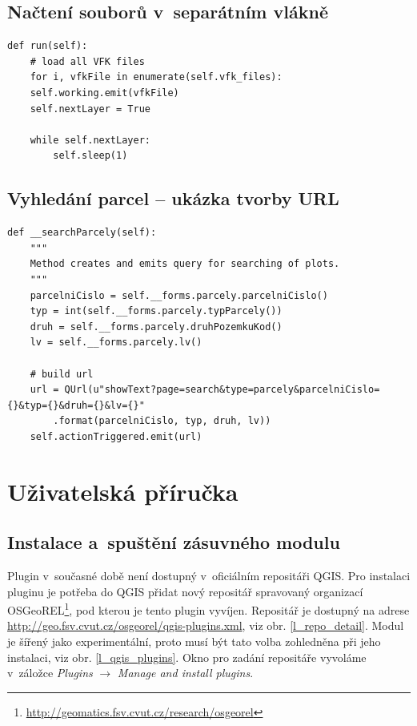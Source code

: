 \documentclass[a4paper,12pt,oneside]{book}
\begin{document}
\section{Načtení souborů v~separátním vlákně}
{\scriptsize
\begin{lstlisting}[style=python, label=l_thread_run]
 def run(self):
    # load all VFK files
    for i, vfkFile in enumerate(self.vfk_files):
	self.working.emit(vfkFile)
	self.nextLayer = True

	while self.nextLayer:
	    self.sleep(1)
\end{lstlisting}
}
\section{Vyhledání parcel -- ukázka tvorby URL}

{\scriptsize
\begin{lstlisting}[style=python, label=l_search_parcely]
def __searchParcely(self):
    """
    Method creates and emits query for searching of plots.
    """
    parcelniCislo = self.__forms.parcely.parcelniCislo()
    typ = int(self.__forms.parcely.typParcely())
    druh = self.__forms.parcely.druhPozemkuKod()
    lv = self.__forms.parcely.lv()

    # build url
    url = QUrl(u"showText?page=search&type=parcely&parcelniCislo={}&typ={}&druh={}&lv={}"
		.format(parcelniCislo, typ, druh, lv))
    self.actionTriggered.emit(url)
\end{lstlisting}
}

\chapter{Uživatelská příručka}
\label{l_prirucka}

\section{Instalace a~spuštění zásuvného modulu}
\label{l_priloha_instalace}
Plugin v~současné době není dostupný v~oficiálním repositáři QGIS. Pro
instalaci pluginu je potřeba do QGIS přidat nový repositář spravovaný
organizací
OSGeoREL\footnote{\url{http://geomatics.fsv.cvut.cz/research/osgeorel}},
pod kterou je tento plugin vyvíjen. Repositář je dostupný na adrese
\url{http://geo.fsv.cvut.cz/osgeorel/qgis-plugins.xml}, viz
obr. \ref{l_repo_detail}. Modul je šířený jako experimentální, proto
musí být tato volba zohledněna při jeho instalaci, viz
obr. \ref{l_qgis_plugins}. Okno pro zadání repositáře vyvoláme
v~záložce \textit{Plugins} $\rightarrow$ \textit{Manage and install
  plugins}.
\end{document}
